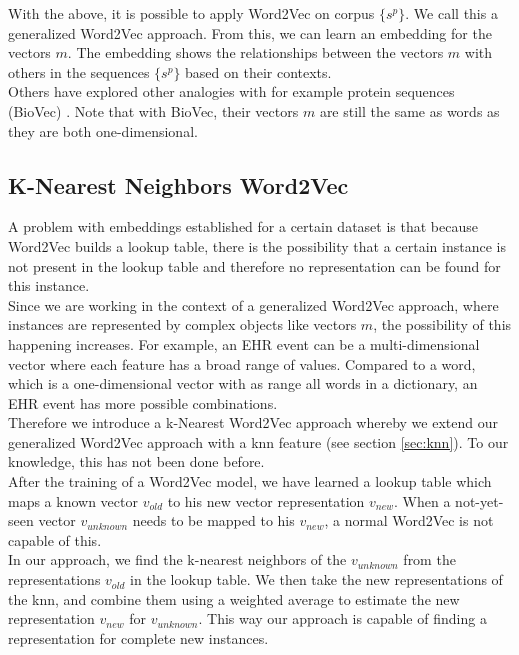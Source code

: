 With the above, it is possible to apply Word2Vec on corpus $\{s^p\}$. We call this a generalized Word2Vec approach. From this, we can learn an embedding for the vectors $m$. The embedding shows the relationships between the vectors $m$ with others in the sequences $\{s^p\}$ based on their contexts. \\
Others have explored other analogies with for example protein sequences (BioVec) \cite{protvec:article}. Note that with BioVec, their vectors $m$ are still the same as words as they are both one-dimensional.


\subsection{K-Nearest Neighbors Word2Vec}
\label{sec:knnWord2Vec}

A problem with embeddings established for a certain dataset is that because Word2Vec builds a lookup table, there is the possibility that a certain instance is not present in the lookup table and therefore no representation can be found for this instance. \\ 
Since we are working in the context of a generalized Word2Vec approach, where instances are represented by complex objects like vectors $m$, the possibility of this happening increases. For example, an EHR event can be a multi-dimensional vector where each feature has a broad range of values. Compared to a word, which is a one-dimensional vector with as range all words in a dictionary, an EHR event has more possible combinations. \\

Therefore we introduce a k-Nearest Word2Vec approach whereby we extend our generalized Word2Vec approach with a knn feature (see section \ref{sec:knn}). To our knowledge, this has not been done before. \\

After the training of a Word2Vec model, we have learned a lookup table which maps a known vector $v_{old}$ to his new vector representation $v_{new}$. When a not-yet-seen vector $v_{unknown}$ needs to be mapped to his $v_{new}$, a normal Word2Vec is not capable of this. \\
In our approach, we find the k-nearest neighbors of the $v_{unknown}$ from the representations $v_{old}$ in the lookup table. We then take the new representations of the knn, and combine them using a weighted average to estimate the new representation $v_{new}$ for $v_{unknown}$. This way our approach is capable of finding a representation for complete new instances. \\

